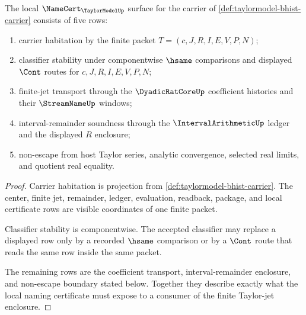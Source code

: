 \begin{theorem}
\label{thm:taylormodel-namecert-obligation-surface}
The local $\NameCert_{\TaylorModelUp}$ surface for the carrier of \autoref{def:taylormodel-bhist-carrier} consists of five rows:
\begin{enumerate}
\item carrier habitation by the finite packet $T=(c,J,R,I,E,V,P,N)$;
\item classifier stability under componentwise $\hsame$ comparisons and displayed $\Cont$ routes for $c,J,R,I,E,V,P,N$;
\item finite-jet transport through the $\DyadicRatCoreUp$ coefficient histories and their $\StreamNameUp$ windows;
\item interval-remainder soundness through the $\IntervalArithmeticUp$ ledger and the displayed $R$ enclosure;
\item non-escape from host Taylor series, analytic convergence, selected real limits, and quotient real equality.
\end{enumerate}
\end{theorem}
\begin{proof}
Carrier habitation is projection from \autoref{def:taylormodel-bhist-carrier}. The center, finite jet, remainder, ledger, evaluation, readback, package, and local certificate rows are visible coordinates of one finite packet.

Classifier stability is componentwise. The accepted classifier may replace a displayed row only by a recorded $\hsame$ comparison or by a $\Cont$ route that reads the same row inside the same packet.

The remaining rows are the coefficient transport, interval-remainder enclosure, and non-escape boundary stated below. Together they describe exactly what the local naming certificate must expose to a consumer of the finite Taylor-jet enclosure.
\end{proof}


